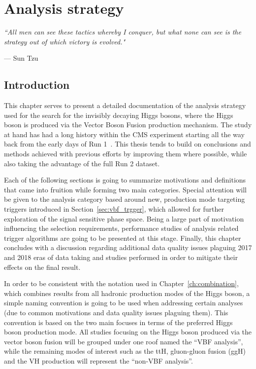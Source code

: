 \chapter{Analysis strategy}
\label{ch:an_strategy}
\epigraph{\itshape``All men can see these tactics whereby I conquer, but what none can see is the strategy out of which victory is evolved."}{--- \textup{Sun Tzu}}

\section{Introduction}
\hspace{10pt}This chapter serves to present a detailed documentation of the analysis strategy used for the search for the invisibly decaying Higgs bosons, where the Higgs boson is produced via the Vector Boson Fusion production mechanism. The study at hand has had a long history within the CMS experiment starting all the way back from the early days of Run 1~\cite{paper:HIG_17_023}. This thesis tends to build on conclusions and methods achieved with previous efforts by improving them where possible, while also taking the advantage of the full Run 2 dataset.

\hspace{10pt} Each of the following sections is going to summarize motivations and definitions that came into fruition while forming two main categories. Special attention will be given to the analysis category based around new, production mode targeting triggers introduced in Section~\ref{sec:vbf_trgger}, which allowed for further exploration of the signal sensitive phase space. Being a large part of motivation influencing the selection requirements, performance studies of analysis related trigger algorithms are going to be presented at this stage. Finally, this chapter concludes with a discussion regarding additional data quality issues plaguing 2017 and 2018 eras of data taking and studies performed in order to mitigate their effects on the final result.

\hspace{10pt} In order to be consistent with the notation used in Chapter~\ref{ch:combination}, which combines results from all hadronic production modes of the Higgs boson, a simple naming convention is going to be used when addressing certain analyses (due to common motivations and data quality issues plaguing them). This convention is based on the two main focuses in terms of the preferred Higgs boson production mode. All studies focusing on the Higgs boson produced via the vector boson fusion will be grouped under one roof named the ``VBF analysis'', while the remaining modes of interest such as the ttH, gluon-gluon fusion (ggH) and the VH production will represent the ``non-VBF analysis''.
